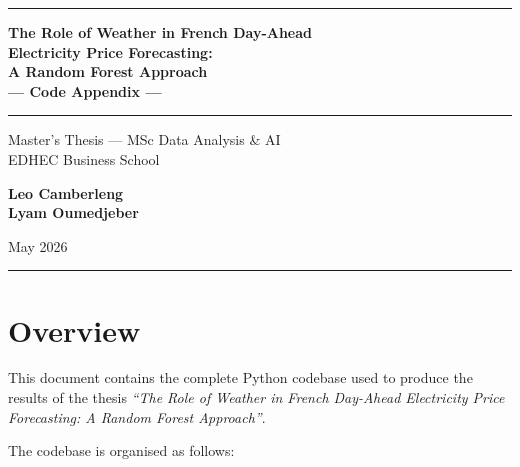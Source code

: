 \documentclass[11pt, a4paper, oneside]{report}
\begin{document}
\begin{titlepage}
  \centering
  \vspace*{2cm}

  {\rule{\linewidth}{2pt}}
  \vspace{0.5cm}

  {\LARGE\bfseries
    The Role of Weather in French Day-Ahead\\[6pt]
    Electricity Price Forecasting:\\[6pt]
    A Random Forest Approach\\[12pt]
    \Large --- Code Appendix ---
  \par}

  \vspace{0.5cm}
  {\rule{\linewidth}{1pt}}
  \vspace{2cm}

  {\large Master's Thesis --- MSc Data Analysis \& AI\\[4pt]
   EDHEC Business School}

  \vspace{2cm}

  {\large\bfseries Leo Camberleng}\\[4pt]
  {\large\bfseries Lyam Oumedjeber}

  \vspace{2cm}

  {\large May 2026}

  \vfill
  {\rule{\linewidth}{2pt}}
\end{titlepage}

\tableofcontents
\clearpage

\chapter*{Overview}

This document contains the complete Python codebase used to produce the results
of the thesis \textit{``The Role of Weather in French Day-Ahead Electricity Price
Forecasting: A Random Forest Approach''}.

\medskip
\noindent The codebase is organised as follows:
\end{document}
